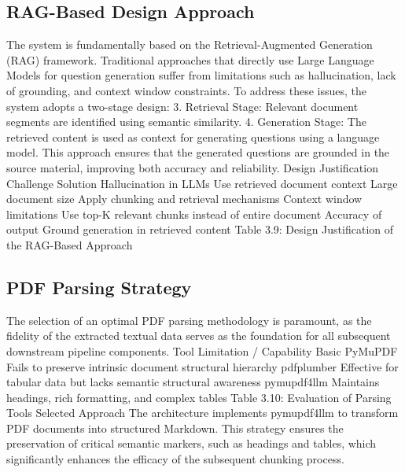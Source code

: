 \documentclass[12pt,a4paper]{report}
\begin{document}
\subsection{RAG-Based Design Approach}
The system is fundamentally based on the Retrieval-Augmented Generation (RAG) framework. Traditional approaches that directly use Large Language Models for question generation suffer from limitations such as hallucination, lack of grounding, and context window constraints. To address these issues, the system adopts a two-stage design:
3. Retrieval Stage: Relevant document segments are identified using semantic similarity.
4. Generation Stage: The retrieved content is used as context for generating questions using a language model.
This approach ensures that the generated questions are grounded in the source material, improving both accuracy and reliability.
Design Justification
Challenge
Solution
Hallucination in LLMs
Use retrieved document context
Large document size
Apply chunking and retrieval mechanisms
Context window limitations
Use top-K relevant chunks instead of entire document
Accuracy of output
Ground generation in retrieved content
Table 3.9: Design Justification of the RAG-Based Approach
\subsection{PDF Parsing Strategy}
The selection of an optimal PDF parsing methodology is paramount, as the fidelity of the extracted textual data serves as the foundation for all subsequent downstream pipeline components.
Tool
Limitation / Capability
Basic PyMuPDF
Fails to preserve intrinsic document structural hierarchy
pdfplumber
Effective for tabular data but lacks semantic structural awareness
pymupdf4llm
Maintains headings, rich formatting, and complex tables
Table 3.10: Evaluation of Parsing Tools
Selected Approach
The architecture implements pymupdf4llm to transform PDF documents into structured Markdown. This strategy ensures the preservation of critical semantic markers, such as headings and tables, which significantly enhances the efficacy of the subsequent chunking process.
\end{document}
